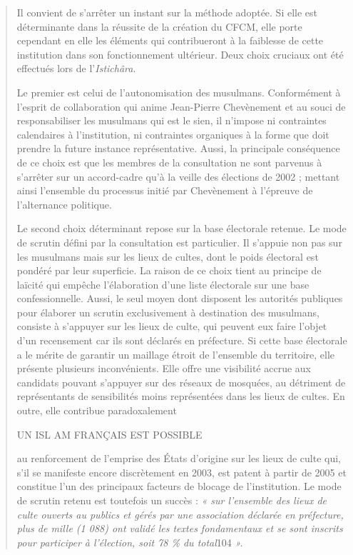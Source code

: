 \begin{quote}
Il convient de s'arrêter un instant sur la méthode adoptée. Si elle est
déterminante dans la réussite de la création du CFCM, elle porte
cependant en elle les éléments qui contribueront à la faiblesse de cette
institution dans son fonctionnement ultérieur. Deux choix cruciaux ont
été effectués lors de l'\emph{Istichâra}.

Le premier est celui de l'autonomisation des musulmans. Conformément à
l'esprit de collaboration qui anime Jean-Pierre Chevènement et au souci
de responsabiliser les musulmans qui est le sien, il n'impose ni
contraintes calendaires à l'institution, ni contraintes organiques à la
forme que doit prendre la future instance représentative. Aussi, la
principale conséquence de ce choix est que les membres de la
consultation ne sont parvenus à s'arrêter sur un accord-cadre qu'à la
veille des élections de 2002 ; mettant ainsi l'ensemble du processus
initié par Chevènement à l'épreuve de l'alternance politique.

Le second choix déterminant repose sur la base électorale retenue. Le
mode de scrutin défini par la consultation est particulier. Il s'appuie
non pas sur les musulmans mais sur les lieux de cultes, dont le poids
électoral est pondéré par leur superficie. La raison de ce choix tient
au principe de laïcité qui empêche l'élaboration d'une liste électorale
sur une base confessionnelle. Aussi, le seul moyen dont disposent les
autorités publiques pour élaborer un scrutin exclusivement à destination
des musulmans, consiste à s'appuyer sur les lieux de culte, qui peuvent
eux faire l'objet d'un recensement car ils sont déclarés en préfecture.
Si cette base électorale a le mérite de garantir un maillage étroit de
l'ensemble du territoire, elle présente plusieurs inconvénients. Elle
offre une visibilité accrue aux candidats pouvant s'appuyer sur des
réseaux de mosquées, au détriment de représentants de sensibilités moins
représentées dans les lieux de cultes. En outre, elle contribue
paradoxalement

UN ISL AM FRANÇAIS EST POSSIBLE

au renforcement de l'emprise des États d'origine sur les lieux de culte
qui, s'il se manifeste encore discrètement en 2003, est patent à partir
de 2005 et constitue l'un des principaux facteurs de blocage de
l'institution. Le mode de scrutin retenu est toutefois un succès :
\emph{« sur l'ensemble des lieux de culte ouverts au publics et gérés
par une association déclarée en préfecture, plus de mille (1 088) ont
validé les textes fondamentaux et se sont inscrits pour participer à
l'élection, soit 78 \% du total}104 \emph{».}
\end{quote}

